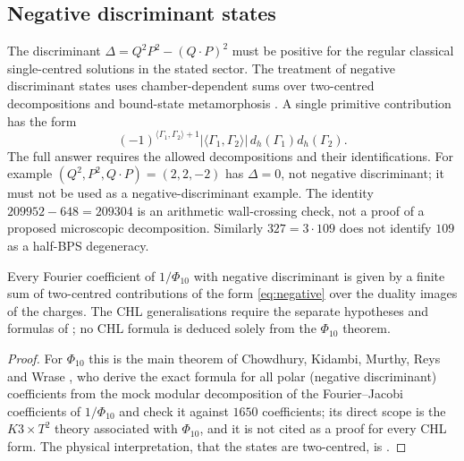 \subsection{Negative discriminant states}\label{ssec:negative}

The discriminant $\Delta=Q^2P^2-(Q\cdot P)^2$ must be positive for the regular classical single-centred solutions in the stated sector. The treatment of negative discriminant states uses chamber-dependent sums over two-centred decompositions and bound-state metamorphosis \cite{Sen11negative,CKMRW20}. A single primitive contribution has the form
\begin{equation}\label{eq:negative}
(-1)^{\langle\Gamma_1,\Gamma_2\rangle+1}|\langle\Gamma_1,\Gamma_2\rangle|\,d_h(\Gamma_1)d_h(\Gamma_2).
\end{equation}
The full answer requires the allowed decompositions and their identifications. For example $(Q^2,P^2,Q\cdot P)=(2,2,-2)$ has $\Delta=0$, not negative discriminant; it must not be used as a negative-discriminant example. The identity $209952-648=209304$ is an arithmetic wall-crossing check, not a proof of a proposed microscopic decomposition. Similarly $327=3\cdot109$ does not identify $109$ as a half-BPS degeneracy.

\begin{theorem}[claim 8]\label{thm:negative}
Every Fourier coefficient of $1/\Phi_{10}$ with negative discriminant is given by a finite sum of two-centred contributions of the form \eqref{eq:negative} over the duality images of the charges. The CHL generalisations require the separate hypotheses and formulas of \cite{Sen11negative}; no CHL formula is deduced solely from the $\Phi_{10}$ theorem.
\end{theorem}

\begin{proof}
For $\Phi_{10}$ this is the main theorem of Chowdhury, Kidambi, Murthy, Reys and Wrase \cite{CKMRW20}, who derive the exact formula for all polar (negative discriminant) coefficients from the mock modular decomposition of the Fourier--Jacobi coefficients of $1/\Phi_{10}$ and check it against $1650$ coefficients; its direct scope is the $K3\times T^2$ theory associated with $\Phi_{10}$, and it is not cited as a proof for every CHL form. The physical interpretation, that the states are two-centred, is \cite{Sen11negative}.
\end{proof}
